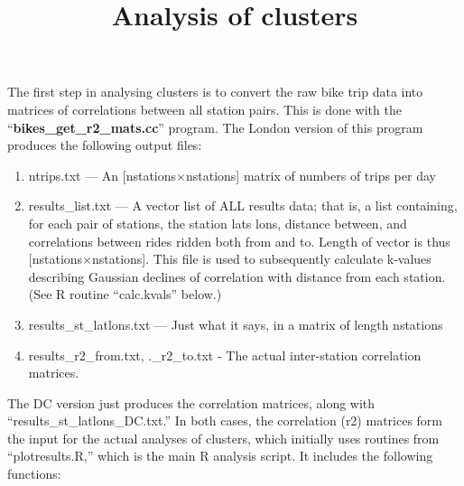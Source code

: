 \documentclass[a4paper,oneside]{article}
\title{Analysis of clusters}
\author{}
\date{}
\begin{document}
\maketitle

The first step in analysing clusters is to convert the raw bike trip data into matrices of correlations between all station pairs. This is done
with the ``{\bf bikes\_get\_r2\_mats.cc}'' program. The London version of this program produces the following output files:
\begin{enumerate}
    \item{ntrips.txt --- An [nstations$\times$nstations] matrix of numbers of trips per day}
    \item{results\_list.txt --- A vector list of ALL results data; that is, a list containing, for each pair of stations, the station lats
        lons, distance between, and correlations between rides ridden both from and to. Length of vector is thus [nstations$\times$nstations].
        This file is used to subsequently calculate k-values describing Gaussian declines of correlation with distance from each station. (See
        R routine ``calc.kvals'' below.)}
    \item{results\_st\_latlons.txt --- Just what it says, in a matrix of length nstations}
    \item{results\_r2\_from.txt, .\_r2\_to.txt - The actual inter-station correlation matrices.}
\end{enumerate}
The DC version just produces the correlation matrices, along with ``results\_st\_latlons\_DC.txt.'' In both cases, the correlation (r2) matrices
form the input for the actual analyses of clusters, which initially uses routines from ``plotresults.R,'' which is the main R analysis script.
It includes the following functions:
\end{document}
